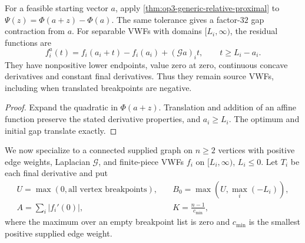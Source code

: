 \begin{corollary}
\label{cor:op3-generic-residual-restart}
For a feasible starting vector $a$, apply
\cref{thm:op3-generic-relative-proximal} to
$\Psi(z)=\Phi(a+z)-\Phi(a)$. The same tolerance gives a factor-$32$
gap contraction from $a$. For separable VWFs with domains $[L_i,\infty)$,
the residual functions are
\[
 f_i^a(t)=f_i(a_i+t)-f_i(a_i)+(\mathcal Ga)_it,
 \qquad t\geq L_i-a_i.
\]
They have nonpositive lower endpoints, value zero at zero, continuous
concave derivatives and constant final derivatives. Thus they remain
source VWFs, including when translated breakpoints are negative.
\end{corollary}
\begin{proof}
Expand the quadratic in $\Phi(a+z)$. Translation and addition of an
affine function preserve the stated derivative properties, and
$a_i\geq L_i$. The optimum and initial gap translate exactly.
\end{proof}

We now specialize to a connected supplied graph on $n\geq2$ vertices
with positive edge weights, Laplacian $\mathcal G$, and finite-piece
VWFs $f_i$ on $[L_i,\infty)$, $L_i\leq0$.
Let $T_i$ be each final derivative and put
\begin{equation}
 \begin{aligned}
 U=\max(0,\text{all vertex breakpoints}),\quad
 &B_0=\max(U,\max_i(-L_i)),\\
 A=\sum_i|f_i'(0)|,\quad &K=\frac{n-1}{c_{\min}},
 \end{aligned}
 \label{eq:op3-generic-input-parameters}
\end{equation}
where the maximum over an empty breakpoint list is zero and $c_{\min}$
is the smallest positive supplied edge weight.

